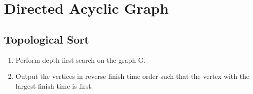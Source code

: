 \section{Directed Acyclic Graph}

\subsection{Topological Sort}
\begin{enumerate}
	\item Perform depth-first search on the graph G.
	\item Output the vertices in reverse finish time order such that the vertex with the largest finish time is first.
\end{enumerate}